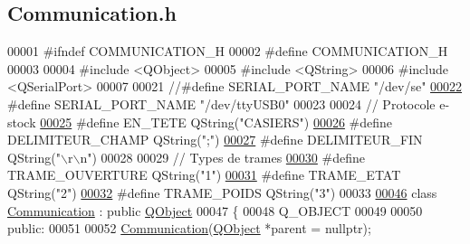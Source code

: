 \hypertarget{_communication_8h_source}{}\subsection{Communication.\+h}
\label{_communication_8h_source}

\begin{DoxyCode}
00001 \textcolor{preprocessor}{#ifndef COMMUNICATION\_H}
00002 \textcolor{preprocessor}{#define COMMUNICATION\_H}
00003 
00004 \textcolor{preprocessor}{#include <QObject>}
00005 \textcolor{preprocessor}{#include <QString>}
00006 \textcolor{preprocessor}{#include <QSerialPort>}
00007 
00021 \textcolor{comment}{//#define SERIAL\_PORT\_NAME "/dev/se"}
\hyperlink{_communication_8h_a8542e30f71d5d41f405c329f0e9bafd7}{00022} \textcolor{preprocessor}{#define SERIAL\_PORT\_NAME "/dev/ttyUSB0"}
00023 
00024 \textcolor{comment}{// Protocole e-stock}
\hyperlink{_communication_8h_add7c72d962d885317215f93ae8a9dc28}{00025} \textcolor{preprocessor}{#define EN\_TETE             QString("CASIERS")}
\hyperlink{_communication_8h_ac3d2c8b3b9dbc07cedf0bfa8a75d268f}{00026} \textcolor{preprocessor}{#define DELIMITEUR\_CHAMP    QString(";")}
\hyperlink{_communication_8h_aafcc0c7b4996f7783c9f4e766a233487}{00027} \textcolor{preprocessor}{#define DELIMITEUR\_FIN      QString("\(\backslash\)r\(\backslash\)n")}
00028 
00029 \textcolor{comment}{// Types de trames}
\hyperlink{_communication_8h_ad49128d4b2d459f0d7f057b2e59fb2d5}{00030} \textcolor{preprocessor}{#define TRAME\_OUVERTURE     QString("1")}
\hyperlink{_communication_8h_a57c2e74056a9338d26f264703e2158d8}{00031} \textcolor{preprocessor}{#define TRAME\_ETAT          QString("2")}
\hyperlink{_communication_8h_a3a24fc54a5e48cb3eb9786ce61933a6c}{00032} \textcolor{preprocessor}{#define TRAME\_POIDS         QString("3")}
00033 
\hyperlink{class_communication}{00046} \textcolor{keyword}{class }\hyperlink{class_communication}{Communication} : \textcolor{keyword}{public} \hyperlink{class_q_object}{QObject}
00047 \{
00048     Q\_OBJECT
00049 
00050 \textcolor{keyword}{public}:
00051 
00052     \hyperlink{class_communication_a56cf4b262e592bcae1d987c3dd00487f}{Communication}(\hyperlink{class_q_object}{QObject} *parent = \textcolor{keyword}{nullptr});

\end{DoxyCode}
